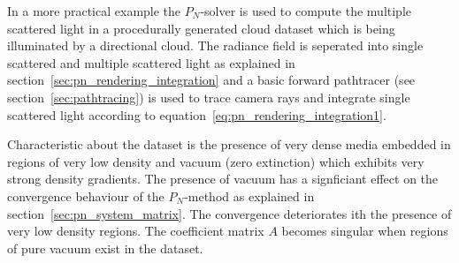 In a more practical example the $P_N$-solver is used to compute the multiple scattered light in a procedurally generated cloud dataset which is being illuminated by a directional cloud. The radiance field is seperated into single scattered and multiple scattered light as explained in section~\ref{sec:pn_rendering_integration} and a basic forward pathtracer (see section~\ref{sec:pathtracing}) is used to trace camera rays and integrate single scattered light according to equation~\ref{eq:pn_rendering_integration1}.

Characteristic about the dataset is the presence of very dense media embedded in regions of very low density and vacuum (zero extinction) which exhibits very strong density gradients. The presence of vacuum has a signficiant effect on the convergence behaviour of the $P_N$-method as explained in section~\ref{sec:pn_system_matrix}. The convergence deteriorates ith the presence of very low density regions. The coefficient matrix $A$ becomes singular when regions of pure vacuum exist in the dataset.

